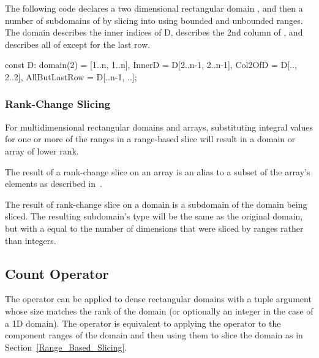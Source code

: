 \begin{example}
The following code declares a two dimensional rectangular
domain , and then a number of subdomains of  by
slicing into  using bounded and unbounded ranges.
The  domain describes the inner indices of
D,  describes the 2nd column of
, and  describes all of  except
for the last row.

\begin{chapel}
const D: domain(2) = [1..n, 1..n],
      InnerD = D[2..n-1, 2..n-1],
      Col2OfD = D[.., 2..2],
      AllButLastRow = D[..n-1, ..];
\end{chapel}
\end{example}

\subsubsection{Rank-Change Slicing}
\label{Rank_Change_Slicing}

For multidimensional rectangular domains and arrays, substituting
integral values for one or more of the ranges in a range-based slice
will result in a domain or array of lower rank.

The result of a rank-change slice on an array is an alias to a subset
of the array's elements as described
in~.

The result of rank-change slice on a domain is a subdomain of the
domain being sliced.  The resulting
subdomain's type will be the same as the original domain, but with
a  equal to the number of dimensions that were sliced by
ranges rather than integers.


\subsection{Count Operator}
\label{Count_Operator_Domains}
The \chpl{#} operator can be applied to dense rectangular domains with
a tuple argument whose size matches the rank of the domain (or
optionally an integer in the case of a 1D domain).  The operator is
equivalent to applying the \chpl{#} operator to the component ranges
of the domain and then using them to slice the domain as in
Section~\ref{Range_Based_Slicing}.


